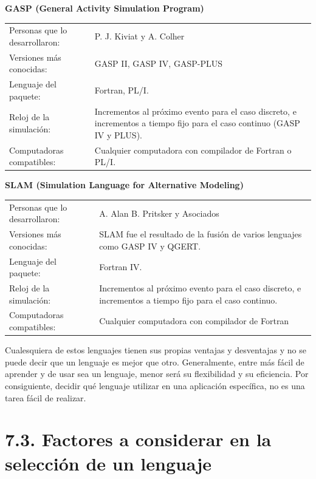 \documentclass[11pt,letterpaper]{report}
\begin{document}
\noindent\textbf{GASP (General Activity Simulation Program)}

\begin{table}[H]
\centering
\begin{tabular}{ll}
Personas que lo desarrollaron: & P. J. Kiviat y A. Colher \\
Versiones más conocidas: & GASP II, GASP IV, GASP-PLUS \\
Lenguaje del paquete: & Fortran, PL/I. \\
Reloj de la simulación: & Incrementos al próximo evento para el caso discreto, e incrementos a tiempo fijo para el caso continuo (GASP IV y PLUS). \\
Computadoras compatibles: & Cualquier computadora con compilador de Fortran o PL/I. \\
\end{tabular}
\end{table}

\noindent\textbf{SLAM (Simulation Language for Alternative Modeling)}

\begin{table}[H]
\centering
\begin{tabular}{ll}
Personas que lo desarrollaron: & A. Alan B. Pritsker y Asociados \\
Versiones más conocidas: & SLAM fue el resultado de la fusión de varios lenguajes como GASP IV y QGERT. \\
Lenguaje del paquete: & Fortran IV. \\
Reloj de la simulación: & Incrementos al próximo evento para el caso discreto, e incrementos a tiempo fijo para el caso continuo. \\
Computadoras compatibles: & Cualquier computadora con compilador de Fortran \\
\end{tabular}
\end{table}

Cualesquiera de estos lenguajes tienen sus propias ventajas y
desventajas y no se puede decir que un lenguaje es mejor que otro.
Generalmente, entre más fácil de aprender y de usar sea un lenguaje,
menor será su flexibilidad y su eficiencia. Por consiguiente, decidir
qué lenguaje utilizar en una aplicación específica, no es una tarea
fácil de realizar.

\section*{7.3. Factores a considerar en la selección de un lenguaje}
\end{document}
